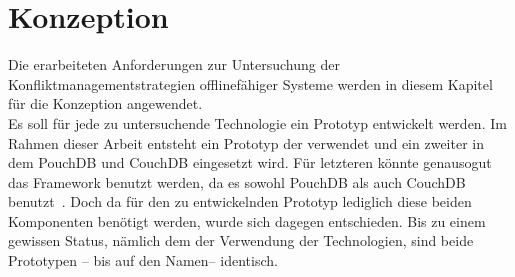 \chapter{\label{chap:konzeption}Konzeption}
Die erarbeiteten Anforderungen zur Untersuchung der Konfliktmanagementstrategien offlinefähiger Systeme werden in diesem Kapitel für die Konzeption angewendet.\\
Es soll für jede zu untersuchende Technologie ein Prototyp entwickelt werden. Im Rahmen dieser Arbeit entsteht ein Prototyp der  verwendet und ein zweiter in dem PouchDB und CouchDB eingesetzt wird. Für letzteren könnte genausogut das Framework  benutzt werden, da es sowohl PouchDB als auch CouchDB benutzt~\cite{hoodie-how}. Doch da für den zu entwickelnden Prototyp lediglich diese beiden Komponenten benötigt werden, wurde sich dagegen entschieden.
Bis zu einem gewissen Status, nämlich dem der Verwendung der Technologien, sind beide Prototypen -- bis auf den Namen-- identisch.
%
%
